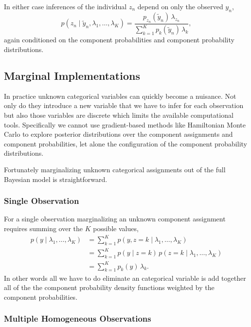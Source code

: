 \documentclass[
  letterpaper,
  DIV=11,
  numbers=noendperiod]{scrartcl}
\begin{document}
In either case inferences of the individual \(z_{n}\) depend on only the
observed \(y_{n}\), \[
p(z_{n} \mid \tilde{y}_{n}, \lambda_{1}, \ldots, \lambda_{K})
=
\frac{ p_{z_{n}}(\tilde{y}_{n}) \, \lambda_{z_{n}}}
{ \sum_{k = 1}^{K} p_{k}(\tilde{y}_{n}) \, \lambda_{k} },
\] again conditioned on the component probabilities and component
probability distributions.

\subsection{Marginal Implementations}\label{marginal-implementations}

In practice unknown categorical variables can quickly become a nuisance.
Not only do they introduce a new variable that we have to infer for each
observation but also those variables are discrete which limits the
available computational tools. Specifically we cannot use gradient-based
methods like Hamiltonian Monte Carlo to explore posterior distributions
over the component assignments and component probabilities, let alone
the configuration of the component probability distributions.

Fortunately marginalizing unknown categorical assignments out of the
full Bayesian model is straightforward.

\subsubsection{Single Observation}\label{single-observation}

For a single observation marginalizing an unknown component assignment
requires summing over the \(K\) possible values, \begin{align*}
p(y \mid \lambda_{1}, \ldots, \lambda_{K})
&=
\sum_{k = 1}^{K}
p(y, z = k \mid \lambda_{1}, \ldots, \lambda_{K})
\\
&=
\sum_{k = 1}^{K}
p(y \mid z = k) \, p(z = k \mid \lambda_{1}, \ldots, \lambda_{K})
\\
&=
\sum_{k = 1}^{K}
p_{k}(y) \, \lambda_{k}.
\end{align*} In other words all we have to do eliminate an categorical
variable is add together all of the the component probability density
functions weighted by the component probabilities.

\subsubsection{Multiple Homogeneous
Observations}\label{multiple-homogeneous-observations}
\end{document}
